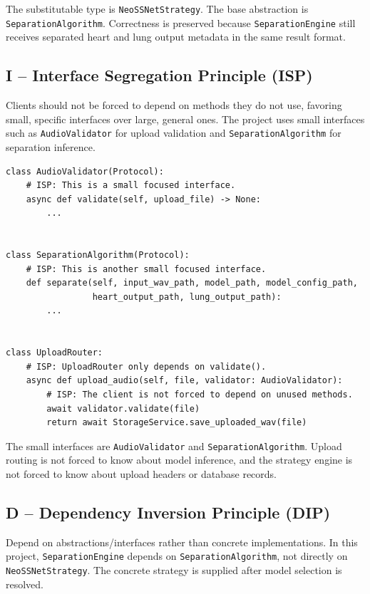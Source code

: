 The substitutable type is \texttt{NeoSSNetStrategy}. The base abstraction is \texttt{SeparationAlgorithm}. Correctness is preserved because \texttt{SeparationEngine} still receives separated heart and lung output metadata in the same result format.

\subsection{I -- Interface Segregation Principle (ISP)}

Clients should not be forced to depend on methods they do not use, favoring small, specific interfaces over large, general ones. The project uses small interfaces such as \texttt{AudioValidator} for upload validation and \texttt{SeparationAlgorithm} for separation inference.

\begin{lstlisting}[caption={ISP Example: Small Focused Interfaces}]
class AudioValidator(Protocol):
    # ISP: This is a small focused interface.
    async def validate(self, upload_file) -> None:
        ...


class SeparationAlgorithm(Protocol):
    # ISP: This is another small focused interface.
    def separate(self, input_wav_path, model_path, model_config_path,
                 heart_output_path, lung_output_path):
        ...


class UploadRouter:
    # ISP: UploadRouter only depends on validate().
    async def upload_audio(self, file, validator: AudioValidator):
        # ISP: The client is not forced to depend on unused methods.
        await validator.validate(file)
        return await StorageService.save_uploaded_wav(file)
\end{lstlisting}

The small interfaces are \texttt{AudioValidator} and \texttt{SeparationAlgorithm}. Upload routing is not forced to know about model inference, and the strategy engine is not forced to know about upload headers or database records.

\subsection{D -- Dependency Inversion Principle (DIP)}

Depend on abstractions/interfaces rather than concrete implementations. In this project, \texttt{SeparationEngine} depends on \texttt{SeparationAlgorithm}, not directly on \texttt{NeoSSNetStrategy}. The concrete strategy is supplied after model selection is resolved.

